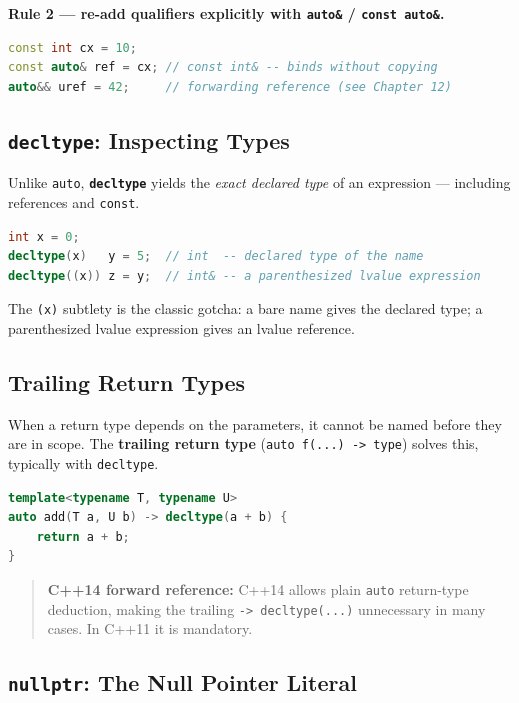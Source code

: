 \textbf{Rule 2 --- re-add qualifiers explicitly with \texttt{auto\&} / \texttt{const auto\&}.}

\begin{lstlisting}[language=C++, caption={preserving qualifiers}]
const int cx = 10;
const auto& ref = cx; // const int& -- binds without copying
auto&& uref = 42;     // forwarding reference (see Chapter 12)
\end{lstlisting}

\subsection{\texttt{decltype}: Inspecting Types}

Unlike \texttt{auto}, \textbf{\texttt{decltype}} yields the \emph{exact declared type} of an expression --- including references and \texttt{const}.

\begin{lstlisting}[language=C++, caption={decltype preserves the exact type}]
int x = 0;
decltype(x)   y = 5;  // int  -- declared type of the name
decltype((x)) z = y;  // int& -- a parenthesized lvalue expression
\end{lstlisting}

The \texttt{(x)} subtlety is the classic gotcha: a bare name gives the declared type; a parenthesized lvalue expression gives an lvalue reference.

\subsection{Trailing Return Types}

When a return type depends on the parameters, it cannot be named before they are in scope. The \textbf{trailing return type} (\texttt{auto f(...) -> type}) solves this, typically with \texttt{decltype}.

\begin{lstlisting}[language=C++, caption={trailing return type with decltype}]
template<typename T, typename U>
auto add(T a, U b) -> decltype(a + b) {
    return a + b;
}
\end{lstlisting}

\begin{quote}
\textbf{C++14 forward reference:} C++14 allows plain \texttt{auto} return-type deduction, making the trailing \texttt{-> decltype(...)} unnecessary in many cases. In C++11 it is mandatory.
\end{quote}

\subsection{\texttt{nullptr}: The Null Pointer Literal}

